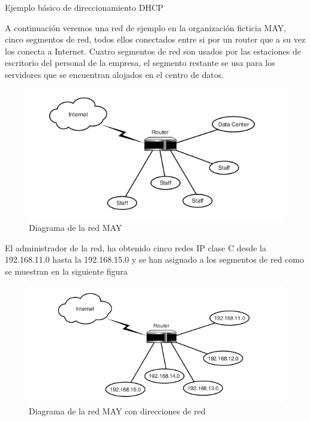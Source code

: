 \begin{frame}{Ejemplo básico de direccionamiento DHCP} %

    A continuación veremos una red de ejemplo en la organización ficticia MAY,
    cinco segmentos de red, todos ellos conectados entre si por un router que
    a su vez los conecta a Internet. Cuatro segmentos de red son usados por las
    estaciones de escritorio del personal de la empresa, el segmento restante
    se usa para los servidores que se encuentran alojados en el centro de
    datos. 

    \begin{figure}
    \begin{center}

    \includegraphics[scale=0.65]{images/2-1.png}
    \caption{Diagrama de la red MAY}
    \label{MAY-1}

    \end{center}
    \end{figure}

    El administrador de la red, ha obtenido cinco redes IP clase C desde la
    192.168.11.0 hasta la 192.168.15.0 y se han asignado a los segmentos de red
    como se muestran en la siguiente figura 

    \begin{figure}
    \begin{center}

    \includegraphics[scale=0.65]{images/2-2.png}
    \caption{Diagrama de la red MAY con direcciones de red}
    \label{MAY-2}


\end{center}
\end{figure}
\end{frame}
